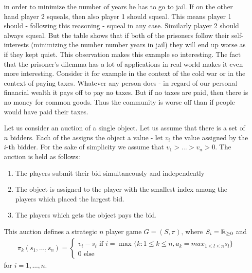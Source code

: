 \begin{example}
    in order to minimize the number of years he has to go to jail. If on the other hand player 2 squeals, then also player 1 should squeal. This means player 1 should - 
    following this reasoning - squeal in any case. Similarly player 2 should always squeal. But the table shows that if both of the prisoners follow their self-interests 
    (minimizing the number number years in jail) they will end up worse as if they kept quiet. This observation makes this example so interesting. The fact that
    the prisoner's dilemma has a lot of applications in real world makes it even more interesting. Consider it for example in the context of the cold war or in the context
    of paying taxes. Whatever any person does - in regard of our personal financial wealth it pays off to pay no taxes. But if no taxes are paid, then there is no money
    for common goods. Thus the community is worse off than if people would have paid their taxes.
\end{example}

\begin{example}
    Let us consider an auction of a single object. Let us assume that there is a set of $n$ bidders. Each of the assigns the object a value - let $v_{i}$ the value assigned
    by the $i$-th bidder. For the sake of simplicity we assume that $v_{1} > \ldots > v_{n} > 0$. The auction is held as follows:
    \begin{enumerate}
        \item The players submit their bid simultaneously and independently
        \item The object is assigned to the player with the smallest index among the players which placed the largest bid.
        \item The players which gets the object pays the bid.
    \end{enumerate}
    This auction defines a strategic $n$ player game $G = (S, \pi)$, where $S_{i} = \mathbb{R}_{\geq0}$ and 
    \begin{align*}
        \pi_{k}(s_{1}, \ldots, s_{n}) = 
            \begin{cases}
                v_{i} - s_{i} \text{ if } i = \max\{k : 1\leq k\leq n, a_{k} = max_{1\leq l\leq n}s_{l}\} \\
                0 \text{ else}
            \end{cases}
    \end{align*}
    for $i = 1, \ldots, n$.
\end{example}

